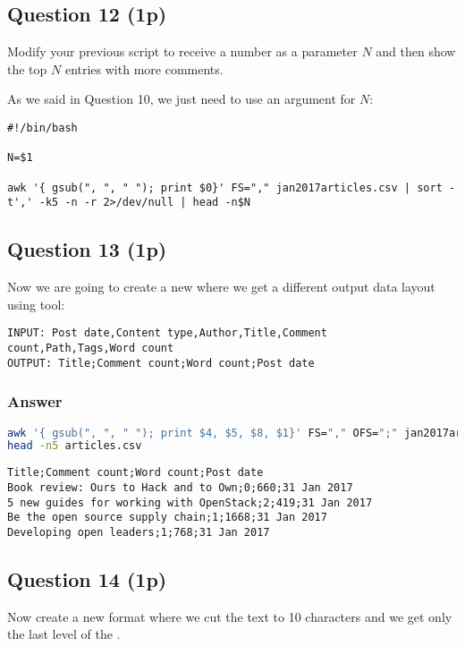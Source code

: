 \subsection*{Question 12 (1p)}
Modify your previous script to receive a number as a parameter $N$ and then show the top $N$ entries with more comments.

As we said in Question 10, we just need to use an argument for $N$:

\renewcommand{\lstlistingname}{Script}
\begin{lstlisting}[caption=Contents of \inline{largest-comments.sh}]
#!/bin/bash

N=$1

awk '{ gsub(", ", " "); print $0}' FS="," jan2017articles.csv | sort -t',' -k5 -n -r 2>/dev/null | head -n$N
\end{lstlisting}
\renewcommand{\lstlistingname}{Snippet}

\subsection*{Question 13 (1p)}
Now we are going to create a new  where we get a different output data layout using  tool:

\begin{lstlisting}[style=output]
INPUT: Post date,Content type,Author,Title,Comment count,Path,Tags,Word count
OUTPUT: Title;Comment count;Word count;Post date
\end{lstlisting}

\subsubsection*{Answer}
\begin{lstlisting}[language=bash]
awk '{ gsub(", ", " "); print $4, $5, $8, $1}' FS="," OFS=";" jan2017articles.csv > articles.csv
head -n5 articles.csv
\end{lstlisting}

\begin{lstlisting}[style=output]
Title;Comment count;Word count;Post date
Book review: Ours to Hack and to Own;0;660;31 Jan 2017
5 new guides for working with OpenStack;2;419;31 Jan 2017
Be the open source supply chain;1;1668;31 Jan 2017
Developing open leaders;1;768;31 Jan 2017
\end{lstlisting}

\subsection*{Question 14 (1p)}
Now create a new  format where we cut the  text to 10 characters and we get only the last level of the .

